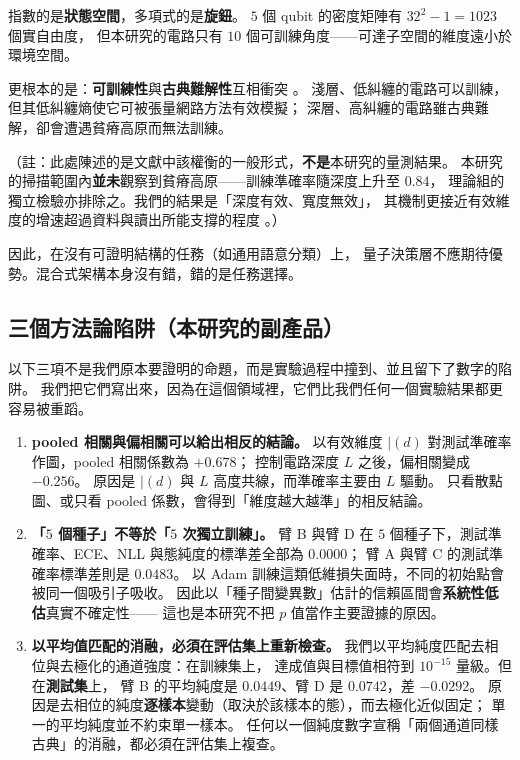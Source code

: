 \documentclass[11pt,a4paper]{ctexart}
\begin{document}
指數的是\textbf{狀態空間}，多項式的是\textbf{旋鈕}。 \(5\) 個 qubit
的密度矩陣有 \(32^{2} - 1 = 1023\) 個實自由度， 但本研究的電路只有
\(10\) 個可訓練角度------可達子空間的維度遠小於環境空間。

更根本的是：\textbf{可訓練性}與\textbf{古典難解性}互相衝突
\cite{anschuetz2024}\cite{cerezo2025}\cite{gilfuster2024}。
淺層、低糾纏的電路可以訓練，但其低糾纏熵使它可被張量網路方法有效模擬；
深層、高糾纏的電路雖古典難解，卻會遭遇貧瘠高原而無法訓練。

（註：此處陳述的是文獻中該權衡的一般形式，\textbf{不是}本研究的量測結果。
本研究的掃描範圍內\textbf{並未}觀察到貧瘠高原------訓練準確率隨深度上升至
\(0.84\)，
理論組的獨立檢驗亦排除之。我們的結果是「深度有效、寬度無效」，
其機制更接近有效維度的增速超過資料與讀出所能支撐的程度
\cite{caro2022generalization}\cite{abbas2021power}\cite{abbas2022effective}。）

因此，在沒有可證明結構的任務（如通用語意分類）上，
量子決策層不應期待優勢。混合式架構本身沒有錯，錯的是任務選擇。

\subsection{三個方法論陷阱（本研究的副產品）}

以下三項不是我們原本要證明的命題，而是實驗過程中撞到、並且留下了數字的陷阱。
我們把它們寫出來，因為在這個領域裡，它們比我們任何一個實驗結果都更容易被重蹈。

\begin{enumerate}
\item
  \textbf{pooled 相關與偏相關可以給出相反的結論。} 以有效維度 \(|(d)\)
  對測試準確率作圖，pooled 相關係數為 \(+ 0.678\)； 控制電路深度 \(L\)
  之後，偏相關變成 \(- 0.256\)。 原因是 \(|(d)\) 與 \(L\)
  高度共線，而準確率主要由 \(L\) 驅動。 只看散點圖、或只看 pooled
  係數，會得到「維度越大越準」的相反結論。
\item
  \textbf{「\(5\) 個種子」不等於「\(5\) 次獨立訓練」。} 臂 B 與臂 D 在
  \(5\) 個種子下，測試準確率、ECE、NLL 與態純度的標準差全部為
  \(0.0000\)； 臂 A 與臂 C 的測試準確率標準差則是 \(0.0483\)。 以 Adam
  訓練這類低維損失面時，不同的初始點會被同一個吸引子吸收。
  因此以「種子間變異數」估計的信賴區間會\textbf{系統性低估}真實不確定性------
  這也是本研究不把 \(p\) 值當作主要證據的原因。
\item
  \textbf{以平均值匹配的消融，必須在評估集上重新檢查。}
  我們以平均純度匹配去相位與去極化的通道強度：在訓練集上，
  達成值與目標值相符到 \(10^{- 15}\) 量級。但在\textbf{測試集}上， 臂 B
  的平均純度是 \(0.0449\)、臂 D 是 \(0.0742\)，差 \(- 0.0292\)。
  原因是去相位的純度\textbf{逐樣本}變動（取決於該樣本的態），而去極化近似固定；
  單一的平均純度並不約束單一樣本。
  任何以一個純度數字宣稱「兩個通道同樣古典」的消融，都必須在評估集上複查。
\end{enumerate}
\end{document}
